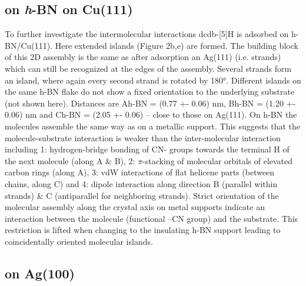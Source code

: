 \subsection{on \textit{h}-BN on Cu(111)}
To further investigate the intermolecular interactions dcdb-[5]H is adsorbed on h-BN/Cu(111). Here extended islands (Figure 2b,e) are formed. The building block of this 2D assembly is the same as after adsorption an Ag(111) (i.e. strands) which can still be recognized at the edges of the assembly. Several strands form an island, where again every second strand is rotated by 180°. Different islands on the same h-BN flake do not show a fixed orientation to the underlying substrate (not shown here). Distances are Ah-BN = (0.77 +- 0.06) nm, Bh-BN = (1.20 +- 0.06) nm and Ch-BN = (2.05 +- 0.06) – close to those on Ag(111). On h-BN the molecules assemble the same way as on a metallic support. This suggests that the molecule-substrate interaction is weaker than the inter-molecular interaction including 1: hydrogen-bridge bonding of CN- groups towards the terminal H of the next molecule (along A \& B), 2: $\pi$-stacking of molecular orbitals of elevated carbon rings (along A), 3: vdW interactions of flat helicene parts (between chains, along C) and 4: dipole interaction along direction B (parallel within strands) \& C (antiparallel for neighboring strands).  Strict orientation of the molecular assembly along the crystal axis on metal supports indicate an interaction between the molecule (functional –CN group) and the substrate. This restriction is lifted when changing to the insulating h-BN support leading to coincidentally oriented molecular islands.

\subsection{on Ag(100)}

